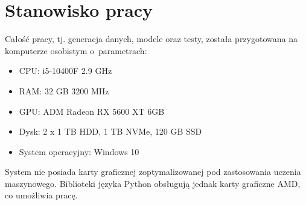\section{Stanowisko pracy}
Całość pracy, tj. generacja danych, modele oraz testy, została przygotowana na komputerze osobistym o~parametrach:

\begin{itemize}[label=-,labelsep=0.4cm,leftmargin=0.6cm]
\item CPU: i5-10400F 2.9 GHz
\item RAM: 32 GB 3200 MHz
\item GPU: ADM Radeon RX 5600 XT 6GB
\item Dysk: 2 x 1 TB HDD, 1 TB NVMe, 120 GB SSD
\item System operacyjny: Windows 10
\end{itemize}
System nie posiada karty graficznej zoptymalizowanej pod zastosowania uczenia maszynowego.
Biblioteki języka Python obsługują jednak karty graficzne AMD, co umożliwia pracę.